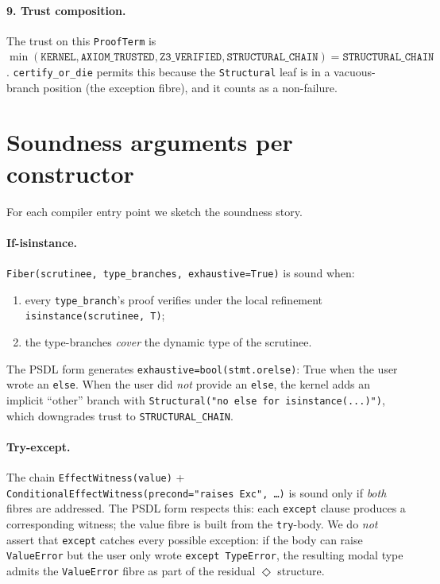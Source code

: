 \paragraph{9. Trust composition.}
The trust on this \texttt{ProofTerm} is
$\min(\mathtt{KERNEL}, \mathtt{AXIOM\_TRUSTED}, \mathtt{Z3\_VERIFIED}, \mathtt{STRUCTURAL\_CHAIN}) = \mathtt{STRUCTURAL\_CHAIN}$.  \texttt{certify\_or\_die} permits this
because the \texttt{Structural} leaf is in a vacuous-branch position
(the exception fibre), and it counts as a non-failure.

\section{Soundness arguments per constructor}
\label{sec:psdl-soundness}

For each compiler entry point we sketch the soundness story.

\paragraph{If-isinstance.}
\texttt{Fiber(scrutinee, type\_branches, exhaustive=True)} is
sound when:
\begin{enumerate}[leftmargin=1.7em]
  \item every \texttt{type\_branch}'s proof verifies under the local
    refinement \texttt{isinstance(scrutinee, T)};
  \item the type-branches \emph{cover} the dynamic type of the
    scrutinee.
\end{enumerate}
The PSDL form generates \texttt{exhaustive=bool(stmt.orelse)}: True
when the user wrote an \texttt{else}.  When the user did \emph{not}
provide an \texttt{else}, the kernel adds an implicit ``other''
branch with \texttt{Structural("no else for isinstance(...)")}, which
downgrades trust to \texttt{STRUCTURAL\_CHAIN}.

\paragraph{Try-except.}
The chain \texttt{EffectWitness(value)} +
\texttt{ConditionalEffectWitness(precond="raises Exc", \dots)} is
sound only if \emph{both} fibres are addressed.  The PSDL form
respects this: each \texttt{except} clause produces a corresponding
witness; the value fibre is built from the \texttt{try}-body.  We do
\emph{not} assert that \texttt{except} catches every possible
exception: if the body can raise \texttt{ValueError} but the user
only wrote \texttt{except TypeError}, the resulting modal type
admits the \texttt{ValueError} fibre as part of the residual
$\Diamond$ structure.

